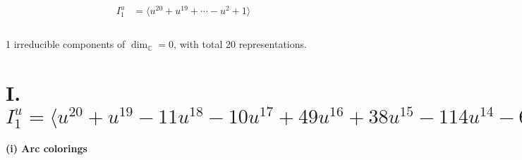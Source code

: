 \documentclass[1p]{elsarticle_modified}
\theoremstyle{definition}
\begin{document}
\begin{align*}
I^u_{1}&=\langle 
u^{20}+u^{19}+\cdots- u^2+1\rangle \\
\\
\end{align*}
\raggedright * 1 irreducible components of $\dim_{\mathbb{C}}=0$, with total 20 representations.\\
\newpage
\renewcommand{\arraystretch}{1}
\centering \section*{I. $I^u_{1}= \langle u^{20}+u^{19}-11 u^{18}-10 u^{17}+49 u^{16}+38 u^{15}-114 u^{14}-66 u^{13}+152 u^{12}+47 u^{11}-125 u^{10}-4 u^9+67 u^8-8 u^7-20 u^6+10 u^5+5 u^4-3 u^3- u^2+1 \rangle$}
\flushleft \textbf{(i) Arc colorings}\\
\end{document}
